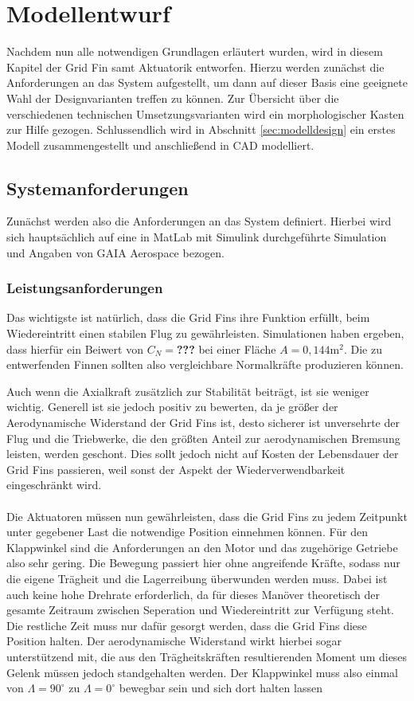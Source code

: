 \chapter{Modellentwurf}\label{sec:modellentwurf}
Nachdem nun alle notwendigen Grundlagen erläutert wurden, wird in diesem Kapitel der Grid Fin samt Aktuatorik entworfen. Hierzu werden zunächst die Anforderungen an das System aufgestellt, um dann auf dieser Basis eine geeignete Wahl der Designvarianten treffen zu können. Zur Übersicht über die verschiedenen technischen Umsetzungsvarianten wird ein morphologischer Kasten zur Hilfe gezogen. Schlussendlich wird in Abschnitt \ref{sec:modelldesign} ein erstes Modell zusammengestellt und anschließend in CAD modelliert.
\section{Systemanforderungen}
Zunächst werden also die Anforderungen an das System definiert. Hierbei wird sich hauptsächlich auf eine in MatLab mit Simulink durchgeführte Simulation und Angaben von GAIA Aerospace bezogen.
\subsection{Leistungsanforderungen}
Das wichtigste ist natürlich, dass die Grid Fins ihre Funktion erfüllt, beim Wiedereintritt einen stabilen Flug zu gewährleisten. Simulationen haben ergeben, dass hierfür ein Beiwert von $C_N =$\textbf{???} bei einer Fläche $A=0,144\mathrm{m}^2$. Die zu entwerfenden Finnen sollten also vergleichbare Normalkräfte produzieren können.

Auch wenn die Axialkraft zusätzlich zur Stabilität beiträgt, ist sie weniger wichtig. Generell ist sie jedoch positiv zu bewerten, da je größer der Aerodynamische Widerstand der Grid Fins ist, desto sicherer ist unversehrte der Flug und die Triebwerke, die den größten Anteil zur aerodynamischen Bremsung leisten, werden geschont. Dies sollt jedoch nicht auf Kosten der Lebensdauer der Grid Fins passieren, weil sonst der Aspekt der Wiederverwendbarkeit eingeschränkt wird.
\\~\\
Die Aktuatoren müssen nun gewährleisten, dass die Grid Fins zu jedem Zeitpunkt unter gegebener Last die notwendige Position einnehmen können. Für den Klappwinkel sind die Anforderungen an den Motor und das zugehörige Getriebe also sehr gering. Die Bewegung passiert hier ohne angreifende Kräfte, sodass nur die eigene Trägheit und die Lagerreibung überwunden werden muss. Dabei ist auch keine hohe Drehrate erforderlich, da für dieses Manöver theoretisch der gesamte Zeitraum zwischen Seperation und Wiedereintritt zur Verfügung steht. Die restliche Zeit muss nur dafür gesorgt werden, dass die Grid Fins diese Position halten. Der aerodynamische Widerstand wirkt hierbei sogar unterstützend mit, die aus den Trägheitskräften resultierenden Moment um dieses Gelenk müssen jedoch standgehalten werden.
Der Klappwinkel muss also einmal von $\Lambda=90^\circ$ zu $\Lambda=0^\circ$ bewegbar sein und sich dort halten lassen

